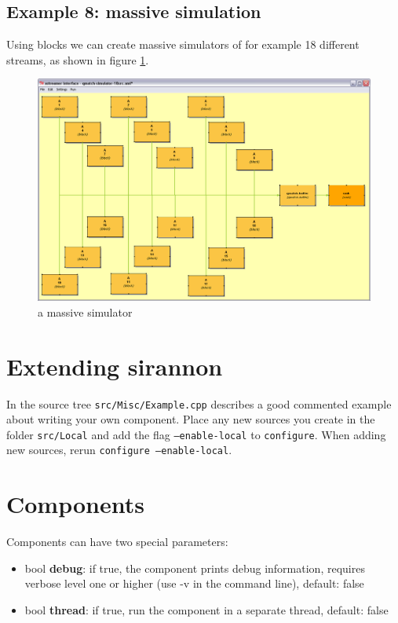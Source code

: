 \documentclass[12pt]{report}
\begin{document}
\section{Example 8: massive simulation}
Using blocks we can create massive simulators of for example 18 different streams, as shown in figure \ref{fig:ex:8}.
\begin{center}
\begin{figure}[!ht]
	\includegraphics[width=1.0\textwidth]{./images/ex08.png}
	\caption{a massive simulator}
	\label{fig:ex:8}
\end{figure}
\end{center}
\newpage

\chapter{Extending sirannon}
In the source tree \texttt{src/Misc/Example.cpp} describes a good commented example about writing your own component. Place any new sources you create in the folder \texttt{src/Local} and add the flag \texttt{--enable-local} to \texttt{configure}. When adding new sources, rerun \texttt{configure --enable-local}.

\chapter{Components}
\label{chap:components}

Components can have two special parameters:
\begin{itemize}
\item bool \textbf{debug}: if true, the component prints debug information, requires verbose level one or higher (use -v in the command line), default: false
\item bool \textbf{thread}: if true, run the component in a separate thread, default: false 
\end{itemize}
\newpage

\end{document}
